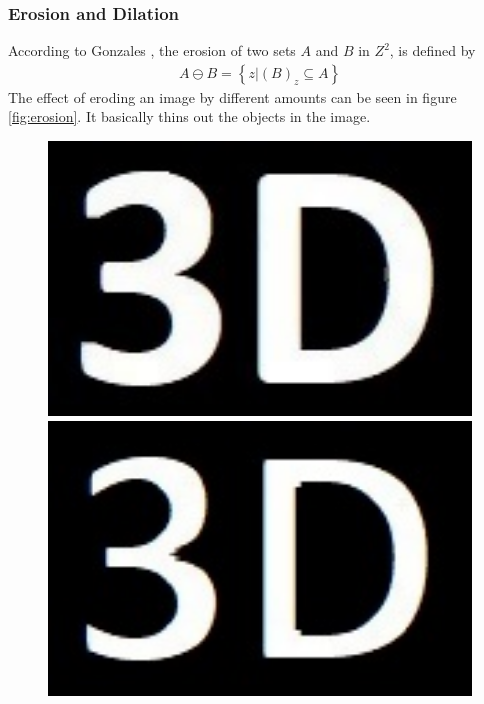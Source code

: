 \subsubsection{Erosion and Dilation}
According to Gonzales  \cite{gonzalez2018digitalChapter9}, the erosion of two sets $A$ and $B$ in $Z^2$, is defined by 
\begin{align*}
	A \ominus B = \left\{z \big| (B)_z \subseteq A\right\}
\end{align*}
The effect of eroding an image by different amounts can be seen in figure \ref{fig:erosion}. It basically thins out the objects in the image. 
\begin{figure}[h!]
	\centering
	\begin{minipage}[t]{0.24\textwidth}
		\centering
		\includegraphics[width=1\textwidth]{figures/ImageAnalysis/Reconstruct/reconstruct_3D.jpg}
	\end{minipage}
	\begin{minipage}[t]{0.24\textwidth}
		\centering	
		\includegraphics[width=1\textwidth]{figures/ImageAnalysis/Reconstruct/3D_Erode_Cross.jpg}

\end{minipage}
\end{figure}
